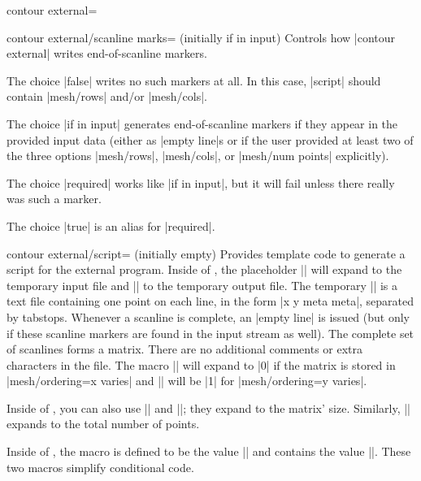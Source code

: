 {{\begin{plottype}[/pgfplots]{
    contour external=\textcolor{black}{}%
}
    \begin{pgfplotskey}{contour external/scanline marks= (initially if in input)}
        Controls how |contour external| writes end-of-scanline markers.

        The choice |false| writes no such markers at all. In this case,
        |script| should contain |mesh/rows| and/or |mesh/cols|.

        The choice |if in input| generates end-of-scanline markers if they
        appear in the provided input data (either as |empty line|s or if the
        user provided at least two of the three options |mesh/rows|,
        |mesh/cols|, or |mesh/num points| explicitly).

        The choice |required| works like |if in input|, but it will fail unless
        there really was such a marker.

        The choice |true| is an alias for |required|.
    \end{pgfplotskey}

    \begin{pgfplotskey}{contour external/script= (initially empty)}
        Provides template code to generate a script for the external program.
        Inside of , the placeholder |\infile|
        will expand to the temporary input file and |\outfile| to the temporary
        output file. The temporary |\infile| is a text file containing one
        point on each line, in the form |x y meta meta|, separated by tabstops.
        Whenever a scanline is complete, an |empty line| is issued (but only if
        these scanline markers are found in the input stream as well). The
        complete set of scanlines forms a matrix. There are no additional
        comments or extra characters in the file. The macro |\ordering| will
        expand to |0| if the matrix is stored in |mesh/ordering=x varies| and
        |\ordering| will be |1| for |mesh/ordering=y varies|.

        Inside of , you can also use
        || and
        ||; they expand to the matrix'
        size. Similarly, || expands
        to the total number of points.

        Inside of , the macro
        \declareandlabel{\thecontournumber} is defined to be the value
        || and
        \declareandlabel{\thecontourlevels} contains the value
        ||. These two macros simplify
        conditional code.


\end{pgfplotskey}
\end{plottype}}}
